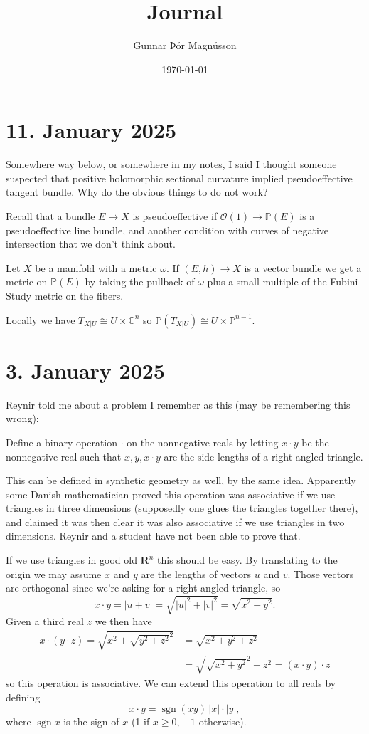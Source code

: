 \documentclass[11pt]{amsart}
\author{Gunnar Þór Magnússon}
\date{\today}
\title{Journal}
\theoremstyle{definition}
\newcommand{\kk}[1]{\mathbb{#1}}
\newcommand{\cc}[1]{\mathcal{#1}}
\def\RR{\mathbf{R}}
\DeclareMathOperator{\sgn}{sgn}
\begin{document}
\maketitle


\section{11. January 2025}


Somewhere way below, or somewhere in my notes, I said I thought someone suspected that positive holomorphic sectional curvature implied pseudoeffective tangent bundle.
Why do the obvious things to do not work?

Recall that a bundle $E \to X$ is pseudoeffective if $\cc O(1) \to \kk P(E)$ is a pseudoeffective line bundle, and another condition with curves of negative intersection that we don't think about.

Let $X$ be a manifold with a metric $\omega$.
If $(E,h) \to X$ is a vector bundle we get a metric on $\kk P(E)$ by taking the pullback of $\omega$ plus a small multiple of the Fubini--Study metric on the fibers.

Locally we have $T_{X|U} \cong U \times \kk C^n$ so $\kk P(T_{X|U}) \cong U \times \kk P^{n-1}$.




\section{3. January 2025}

Reynir told me about a problem I remember as this (may be remembering this wrong):

Define a binary operation $\cdot$ on the nonnegative reals by letting $x \cdot y$ be the nonnegative real such that $x, y, x \cdot y$ are the side lengths of a right-angled triangle.

This can be defined in synthetic geometry as well, by the same idea.
Apparently some Danish mathematician proved this operation was associative if we use triangles in three dimensions (supposedly one glues the triangles together there), and claimed it was then clear it was also associative if we use triangles in two dimensions.
Reynir and a student have not been able to prove that.

If we use triangles in good old $\RR^n$ this should be easy.
By translating to the origin we may assume $x$ and $y$ are the lengths of vectors $u$ and $v$.
Those vectors are orthogonal since we're asking for a right-angled triangle, so
\[
x \cdot y
= |u + v|
= \sqrt{|u|^2 + |v|^2}
= \sqrt{x^2 + y^2}.
\]
Given a third real $z$ we then have
\begin{align*}
x \cdot (y \cdot z)
= \sqrt{x^2 + \sqrt{y^2 + z^2}^2}
&= \sqrt{x^2 + y^2 + z^2}
\\
&= \sqrt{\sqrt{x^2 + y^2}^2 + z^2}
= (x \cdot y) \cdot z
\end{align*}
so this operation is associative.
We can extend this operation to all reals by defining
\[
x \cdot y
= \sgn(xy) \, |x| \cdot |y|,
\]
where $\sgn x$ is the sign of $x$ (1 if $x \geq 0$, $-1$ otherwise).
\end{document}
